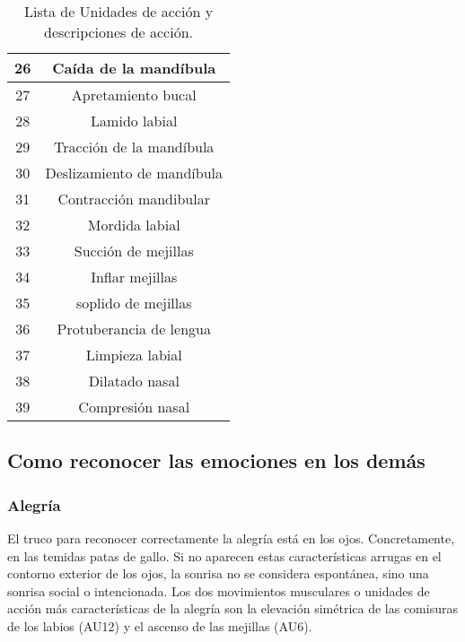 \begin{table}[H]
\begin{tabular}{|c|c|}
26            & Caída de la mandíbula               \\ \hline
27            & Apretamiento bucal                  \\ \hline
28            & Lamido labial                       \\ \hline
29            & Tracción de la mandíbula            \\ \hline
30            & Deslizamiento de mandíbula          \\ \hline
31            & Contracción mandibular              \\ \hline
32            & Mordida labial                      \\ \hline
33            & Succión de mejillas                 \\ \hline
34            & Inflar mejillas                     \\ \hline
35            & soplido de mejillas                 \\ \hline
36            & Protuberancia de lengua             \\ \hline
37            & Limpieza labial                     \\ \hline
38            & Dilatado nasal                      \\ \hline
39            & Compresión nasal                    \\ \hline
\end{tabular}
\caption{Lista de Unidades de acción y descripciones de acción.}
    \label{cuadro:AU}
\end{table}

\subsection*{Como reconocer las emociones en los demás}

\subsubsection*{Alegría}
El truco para reconocer correctamente la alegría está en los ojos. Concretamente, en las temidas patas de gallo. Si no aparecen estas características arrugas en el contorno exterior de los ojos, la sonrisa no se considera espontánea, sino una sonrisa social o intencionada. Los dos movimientos musculares o unidades de acción más características de la alegría son la elevación simétrica de las comisuras de los labios (AU12) y el ascenso de las mejillas (AU6).

